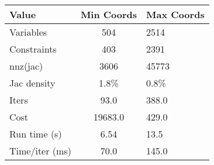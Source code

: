\begin{tabular}{lcl}
\toprule 
Value & Min Coords & Max Coords \\
\midrule 
Variables & 504 & 2514 \\
Constraints & 403 & 2391 \\
nnz(jac) & 3606 & 45773 \\
Jac density & 1.8\% & 0.8\% \\
Iters & 93.0 & 388.0 \\
Cost & 19683.0 & 429.0 \\
Run time (s) & 6.54 & 13.5 \\
Time/iter (ms) & 70.0 & 145.0 \\
\bottomrule 
\end{tabular}
